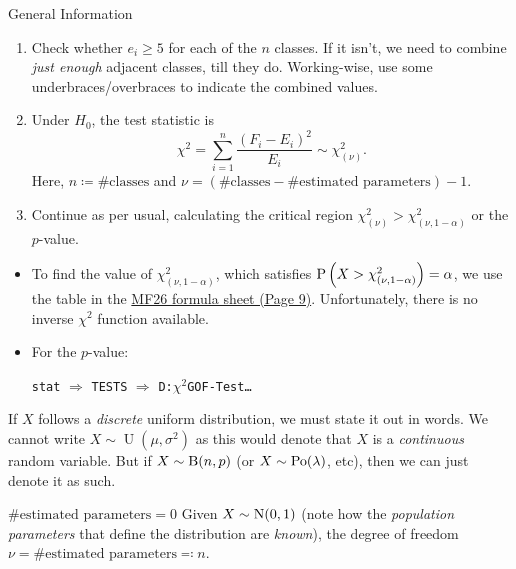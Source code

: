 \documentclass[../Notes.tex]{subfiles}
\begin{document}
\begin{stbox}{General Information}
\begin{itemize}
\begin{enumerate}
\begin{table}[H]
        \label{table:goodness-of-fit-test}
      \end{table}
      \item Check whether \(e_i\geq 5\) for each of the \(n\) classes. If it isn't, we need to combine \emph{just enough} adjacent classes, till they do. Working-wise, use some underbraces/overbraces to indicate the combined values. 
      \item Under \(H_0\), the test statistic is
      \[\chi^2=\sum_{i=1}^{n}{\frac{(F_i-E_i)^2}{E_i}}\sim\chi_{(\nu)}^2.\]
      Here, \(n\coloneq\#\text{classes}\) and \(\nu=(\#\text{classes}-\#\text{estimated parameters})-1\).
      \item Continue as per usual, calculating the critical region \(\chi_{(\nu)}^2>\chi^2_{(\nu,1-\alpha)}\) or the \(p\)-value.
    \end{enumerate}
  \end{itemize}
\end{stbox}
\begin{GCSkills}{}
  \begin{itemize}
    \item To find the value of \(\chi^2_{(\nu,1-\alpha)}\), which satisfies \(\operatorname{P}\left(X>\chi^2_{(\nu,1-\alpha)}\right)=\alpha\), we use the table in the \href{https://www.seab.gov.sg/docs/default-source/national-examinations/syllabus/alevel/2022syllabus/List_MF26_y22_sy.pdf}{MF26 formula sheet (Page 9)}. Unfortunately, there is no inverse \(\chi^2\) function available.
    \item For the \(p\)-value:
    \begin{center}
      \texttt{stat} \(\Longrightarrow\) \texttt{TESTS} \(\Longrightarrow\) \texttt{D:\(\chi^2\)GOF-Test\dots}
    \end{center}
  \end{itemize}
\end{GCSkills}
\begin{note}
  If \(X\) follows a \emph{discrete} uniform distribution, we must state it out in words. We cannot write \(X\sim\operatorname{U}(\mu,\sigma^2)\) as this would denote that \(X\) is a \emph{continuous} random variable. But if \(X\sim\operatorname{B}(n,p)\) (or \(X\sim\operatorname{Po}(\lambda)\), etc), then we can just denote it as such. 
\end{note}
\begin{example}{\(\#\text{estimated parameters}=0\)}{}
  Given \(X\sim\operatorname{N}(0,1)\) (note how the \emph{population parameters} that define the distribution are \emph{known}), the degree of freedom \(\nu=\#\text{estimated parameters}\eqcolon n\).
\end{example}
\end{document}
